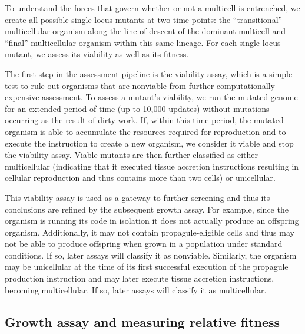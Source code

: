 \documentclass[
]{book}
\begin{document}
To understand the forces that govern whether or not a multicell is entrenched, we create all possible single-locus mutants at two time points: the ``transitional'' multicellular organism along the line of descent of the dominant multicell and ``final'' multicellular organism within this same lineage. For each single-locus mutant, we assess its viability as well as its fitness.

The first step in the assessment pipeline is the viability assay, which is a simple test to rule out organisms that are nonviable from further computationally expensive assessment. To assess a mutant's viability, we run the mutated genome for an extended period of time (up to 10,000 updates) without mutations occurring as the result of dirty work. If, within this time period, the mutated organism is able to accumulate the resources required for reproduction and to execute the instruction to create a new organism, we consider it viable and stop the viability assay. Viable mutants are then further classified as either multicellular (indicating that it executed tissue accretion instructions resulting in cellular reproduction and thus contains more than two cells) or unicellular.

This viability assay is used as a gateway to further screening and thus its conclusions are refined by the subsequent growth assay. For example, since the organism is running its code in isolation it does not actually produce an offspring organism. Additionally, it may not contain propagule-eligible cells and thus may not be able to produce offspring when grown in a population under standard conditions. If so, later assays will classify it as nonviable. Similarly, the organism may be unicellular at the time of its first successful execution of the propagule production instruction and may later execute tissue accretion instructions, becoming multicellular. If so, later assays will classify it as multicellular.

\hypertarget{growth-assay-and-measuring-relative-fitness}{%
\subsection{Growth assay and measuring relative fitness}\label{growth-assay-and-measuring-relative-fitness}}
\end{document}
